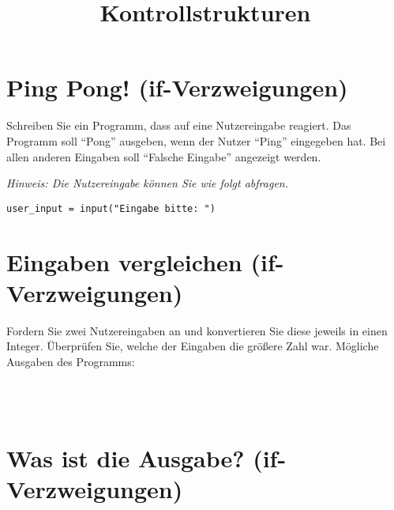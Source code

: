 

\title{Kontrollstrukturen}

\ihead{}
\chead{}
\ohead{}
\ifoot{}
\cfoot{\pagemark}
\ofoot{}



\setlength{\parskip}{1em}
\setlength{\parindent}{0em}
\renewcommand{\baselinestretch}{1.15}



\docheader

\section{Ping Pong! \small{(if-Verzweigungen)}}

Schreiben Sie ein Programm, dass auf eine Nutzereingabe reagiert. Das Programm soll "`Pong"' ausgeben, wenn der Nutzer "`Ping"' eingegeben hat. Bei allen anderen Eingaben soll "`Falsche Eingabe"' angezeigt werden.

\textit{Hinweis: Die Nutzereingabe können Sie wie folgt abfragen.}
\vspace{1em}
\begin{lstlisting}
user_input = input("Eingabe bitte: ")
\end{lstlisting}



\section{Eingaben vergleichen \small{(if-Verzweigungen)}}

Fordern Sie zwei Nutzereingaben an und konvertieren Sie diese jeweils in einen Integer. Überprüfen Sie, welche der Eingaben die größere Zahl war. Mögliche Ausgaben des Programms:

 \\
 \\



\section{Was ist die Ausgabe? \small{(if-Verzweigungen)}}



